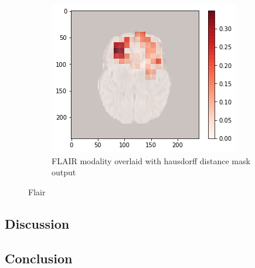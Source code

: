 \begin{figure}[H]
\begin{subfigure}{.33\textwidth}
    \end{subfigure}
        \begin{subfigure}{.33\textwidth}
        \centering
        \includegraphics[width=\linewidth]{chapters/07_brats3d/images/12_flair_hdm.png}
        \caption{FLAIR modality overlaid with hausdorff distance mask output}
    \end{subfigure}
    \caption{Flair}
\end{figure}

\subsection{Discussion}


\subsection{Conclusion}
